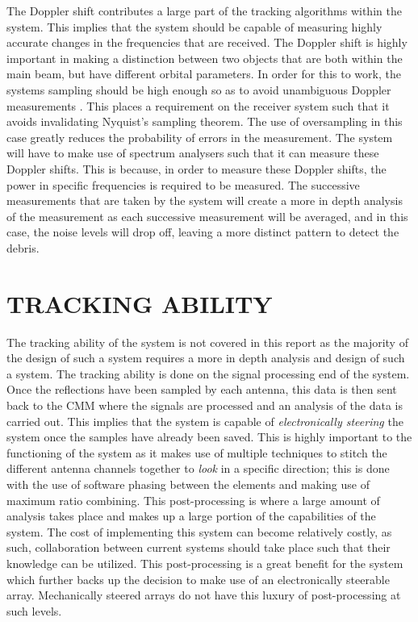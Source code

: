 \documentclass[11pt]{witseiepaper}
\begin{document}
\begin{bibunit}[witseie]
The Doppler shift contributes a large part of the tracking algorithms within the system. This implies that the system should be capable of measuring highly accurate changes in the frequencies that are received. The Doppler shift is highly important in making a distinction between two objects that are both within the main beam, but have different orbital parameters. In order for this to work, the systems sampling should be high enough so as to avoid unambiguous Doppler measurements \cite[p.~24]{radarHandbook}. This places a requirement on the receiver system such that it avoids invalidating Nyquist's sampling theorem. The use of oversampling in this case greatly reduces the probability of errors in the measurement.
The system will have to make use of spectrum analysers such that it can measure these Doppler shifts. This is because, in order to measure these Doppler shifts, the power in specific frequencies is required to be measured.
The successive measurements that are taken by the system will create a more in depth analysis of the measurement as each successive measurement will be averaged, and in this case, the noise levels will drop off, leaving a more distinct pattern to detect the debris.

\section{TRACKING ABILITY} \label{sec:TrackingAbility}
The tracking ability of the system is not covered in this report as the majority of the design of such a system requires a more in depth analysis and design of such a system. The tracking ability is done on the signal processing end of the system. Once the reflections have been sampled by each antenna, this data is then sent back to the CMM where the signals are processed and an analysis of the data is carried out. This implies that the system is capable of \textit{electronically steering} the system once the samples have already been saved. This is highly important to the functioning of the system as it makes use of multiple techniques to stitch the different antenna channels together to \textit{look} in a specific direction; this is done with the use of software phasing between the elements and making use of maximum ratio combining.
This post-processing is where a large amount of analysis takes place and makes up a large portion of the capabilities of the system. The cost of implementing this system can become relatively costly, as such, collaboration between current systems should take place such that their knowledge can be utilized.
This post-processing is a great benefit for the system which further backs up the decision to make use of an electronically steerable array. Mechanically steered arrays do not have this luxury of post-processing at such levels.


\end{bibunit}
\end{document}
